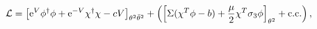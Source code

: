 \begin{equation}
 {\cal L} 
=
 \left[ {\rm e}^V \phi^\dagger\phi 
+ {\rm e}^{-V} \chi^\dagger\chi - c V
\right]_{\theta^2\bar\theta^2} 
+\left(\left[\Sigma (\chi^T %
\phi - b)
+{\mu \over 2} \chi^T \sigma_3 \phi \right]_{\theta^2}
         + {\rm c.c.}\right) ,
\label{linear}
\end{equation}

